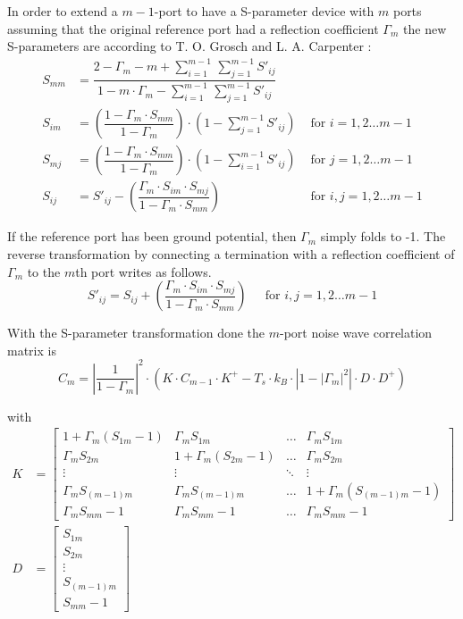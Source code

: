 In order to extend a $m - 1$-port to have a S-parameter device with
$m$ ports assuming that the original reference port had a reflection
coefficient $\Gamma_m$ the new S-parameters are according to
T. O. Grosch and L. A. Carpenter \cite{Grosch}:
\begin{align}
S_{mm} &= \dfrac{2 - \Gamma_m - m + {\displaystyle\sum_{i=1}^{m-1}}\, {\displaystyle\sum_{j=1}^{m-1}} S'_{ij}}{1 - m\cdot \Gamma_m - {\displaystyle\sum_{i=1}^{m-1}}\, {\displaystyle\sum_{j=1}^{m-1}} S'_{ij}}\\
S_{im} &= \left(\dfrac{1 - \Gamma_m\cdot S_{mm}}{1 - \Gamma_m}\right)\cdot \left(1 - \sum_{j=1}^{m-1} S'_{ij}\right) &
\textrm{ for } i = 1,2 \ldots m - 1\\
S_{mj} &= \left(\dfrac{1 - \Gamma_m\cdot S_{mm}}{1 - \Gamma_m}\right)\cdot \left(1 - \sum_{i=1}^{m-1} S'_{ij}\right) &
\textrm{ for } j = 1,2 \ldots m - 1\\
S_{ij} &= S'_{ij} - \left(\dfrac{\Gamma_m\cdot S_{im}\cdot S_{mj}}{1 - \Gamma_m\cdot S_{mm}}\right) &
\textrm{ for } i,j = 1,2 \ldots m - 1
\end{align}

If the reference port has been ground potential, then $\Gamma_m$
simply folds to -1.  The reverse transformation by connecting a
termination with a reflection coefficient of $\Gamma_m$ to the $m$th
port writes as follows.
\begin{equation}
S'_{ij} = S_{ij} + \left(\dfrac{\Gamma_m\cdot S_{im}\cdot S_{mj}}{1 - \Gamma_m\cdot S_{mm}}\right)
\;\;\;\; \textrm{ for } i,j = 1,2 \ldots m - 1
\end{equation}

With the S-parameter transformation done the $m$-port noise wave
correlation matrix is
\begin{equation}
C_m = \left|\dfrac{1}{1 - \Gamma_m}\right|^2 \cdot \left(K\cdot C_{m-1}\cdot K^+ -T_s\cdot k_B \cdot\left|1 - \left|\Gamma_m\right|^2\right|\cdot D\cdot D^+\right)
\end{equation}

with
\begin{align}
K &=
\begin{bmatrix}
1 + \Gamma_m\left(S_{1m} -1\right) & \Gamma_m S_{1m} & \ldots & \Gamma_m S_{1m}\\
\Gamma_m S_{2m} & 1 + \Gamma_m\left(S_{2m} -1\right) & \ldots & \Gamma_m S_{2m}\\
\vdots & \vdots & \ddots & \vdots\\
\Gamma_m S_{(m-1)m} & \Gamma_m S_{(m-1)m} & \ldots & 1 + \Gamma_m\left(S_{(m-1)m} -1\right)\\
\Gamma_m S_{mm} - 1 & \Gamma_m S_{mm} - 1 & \ldots & \Gamma_m S_{mm} - 1
\end{bmatrix}\\
D &=
\begin{bmatrix}
S_{1m}\\
S_{2m}\\
\vdots\\
S_{(m-1)m}\\
S_{mm} - 1
\end{bmatrix}
\end{align}

